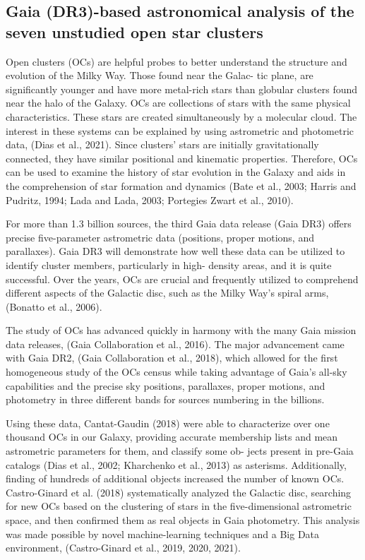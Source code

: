 \documentclass[../main.tex]{subfiles}
\begin{document}
{\subsection{Gaia (DR3)-based astronomical analysis of the seven unstudied open star
	clusters}

Open clusters (OCs) are helpful probes to better understand the
structure and evolution of the Milky Way. Those found near the Galac-
tic plane, are significantly younger and have more metal-rich stars than
globular clusters found near the halo of the Galaxy. OCs are collections
of stars with the same physical characteristics. These stars are created
simultaneously by a molecular cloud. The interest in these systems can
be explained by using astrometric and photometric data, (Dias et al.,
2021). Since clusters’ stars are initially gravitationally connected, they
have similar positional and kinematic properties. Therefore, OCs can be
used to examine the history of star evolution in the Galaxy and aids in
the comprehension of star formation and dynamics (Bate et al., 2003;
Harris and Pudritz, 1994; Lada and Lada, 2003; Portegies Zwart et al.,
2010).

For more than 1.3 billion sources, the third Gaia data release (Gaia
DR3) offers precise five-parameter astrometric data (positions, proper
motions, and parallaxes). Gaia DR3 will demonstrate how well these
data can be utilized to identify cluster members, particularly in high-
density areas, and it is quite successful. Over the years, OCs are crucial
and frequently utilized to comprehend different aspects of the Galactic
disc, such as the Milky Way’s spiral arms, (Bonatto et al., 2006).

The study of OCs has advanced quickly in harmony with the many
Gaia mission data releases, (Gaia Collaboration et al., 2016). The major
advancement came with Gaia DR2, (Gaia Collaboration et al., 2018),
which allowed for the first homogeneous study of the OCs census
while taking advantage of Gaia’s all-sky capabilities and the precise sky
positions, parallaxes, proper motions, and photometry in three different
bands for sources numbering in the billions.

Using these data, Cantat-Gaudin (2018) were able to characterize
over one thousand OCs in our Galaxy, providing accurate membership
lists and mean astrometric parameters for them, and classify some ob-
jects present in pre-Gaia catalogs (Dias et al., 2002; Kharchenko et al.,
2013) as asterisms. Additionally, finding of hundreds of additional
objects increased the number of known OCs. Castro-Ginard et al. (2018)
systematically analyzed the Galactic disc, searching for new OCs based
on the clustering of stars in the five-dimensional astrometric space, and
then confirmed them as real objects in Gaia photometry. This analysis
was made possible by novel machine-learning techniques and a Big
Data environment, (Castro-Ginard et al., 2019, 2020, 2021).

}
\end{document}
